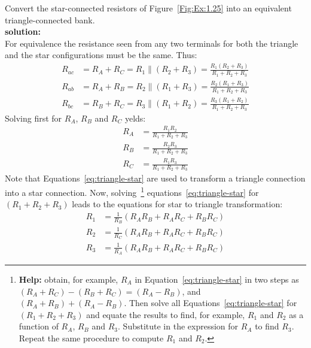 \begin{exercise}
\label{ex:1.25}
Convert the star-connected resistors of Figure~\ref{Fig:Ex:1.25} into an equivalent triangle-connected bank.\\

\textbf{solution:}\\ 
For equivalence the resistance seen from any two terminals for both the triangle and the star configurations must be the same. Thus:
\begin{equation*}
\begin{split}
R_{ac} &= R_A + R_C = R_1 \parallel (R_2 + R_3) = \frac{R_1(R_2 + R_3)}{R_1 + R_2 + R_3}\\
R_{ab} &= R_A + R_B = R_2 \parallel (R_1 + R_3) =
\frac{R_2(R_1 + R_3)}{R_1 + R_2 + R_3}\\
R_{bc} &= R_B + R_C = R_3 \parallel (R_1 + R_2) =
\frac{R_3(R_1 + R_2)}{R_1 + R_2 + R_3}
\end{split}
\end{equation*}
Solving first for $R_A$, $R_B$ and $R_C$ yelds:
\begin{equation}
\label{eq:triangle-star}
\begin{split}
R_A &= \frac{R_1R_2}{R_1 + R_2 + R_3}\\
R_B &= \frac{R_2R_3}{R_1 + R_2 + R_3}\\
R_C &= \frac{R_1R_3}{R_1 + R_2 + R_3}
\end{split}
\end{equation}
Note that Equations~\ref{eq:triangle-star} are used to transform a triangle connection into a star connection.
Now, solving~\footnote{\textbf{Help:} obtain, for example, $R_A$ in Equation~\ref{eq:triangle-star} in two steps as $(R_A + R_C) - (R_B + R_C) = (R_A - R_B)$, and $(R_A + R_B) + (R_A - R_B)$. Then solve all Equations~\ref{eq:triangle-star} for $(R_1 + R_2 + R_3)$ and equate the results to find, for example, $R_1$ and $R_2$ as a function of $R_A$, $R_B$ and $R_3$. Substitute in the expression for $R_A$ to find $R_3$. Repeat the same procedure to compute $R_1$ and $R_2$.} equations~\ref{eq:triangle-star} for $(R_1 + R_2 + R_3)$ leads to the equations for star to triangle transformation:
\begin{equation}
\begin{split}
R_1 &= \frac{1}{R_B}(R_AR_B + R_AR_C + R_BR_C)\\
R_2 &= \frac{1}{R_C}(R_AR_B + R_AR_C + R_BR_C)\\
R_3 &= \frac{1}{R_A}(R_AR_B + R_AR_C + R_BR_C)
\end{split}
\end{equation}
\end{exercise}

